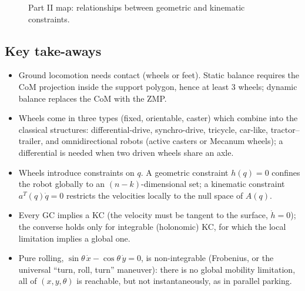 \documentclass[11pt,a4paper]{article}
\theoremstyle{definition}
\theoremstyle{plain}
\begin{document}
\begin{figure}[H]
\centering
{}
\caption{Part II map: relationships between geometric and kinematic constraints.}
\end{figure}
 
\subsection{Key take-aways}
\begin{itemize}
  \item Ground locomotion needs contact (wheels or feet). Static balance requires the CoM projection inside the support polygon, hence at least 3 wheels; dynamic balance replaces the CoM with the ZMP.
  \item Wheels come in three types (fixed, orientable, caster) which combine into the classical structures: differential-drive, synchro-drive, tricycle, car-like, tractor--trailer, and omnidirectional robots (active casters or Mecanum wheels); a differential is needed when two driven wheels share an axle.
  \item Wheels introduce constraints on $q$. A geometric constraint $h(q)=0$ confines the robot globally to an $(n-k)$-dimensional set; a kinematic constraint $a^{T}(q)\dot q=0$ restricts the velocities locally to the null space of $A(q)$.
  \item Every GC implies a KC (the velocity must be tangent to the surface, $\dot h=0$); the converse holds only for integrable (holonomic) KC, for which the local limitation implies a global one.
  \item Pure rolling, $\sin\theta\,\dot x-\cos\theta\,\dot y=0$, is non-integrable (Frobenius, or the universal ``turn, roll, turn'' maneuver): there is no global mobility limitation, all of $(x,y,\theta)$ is reachable, but not instantaneously, as in parallel parking.
\end{itemize}
 
\end{document}
